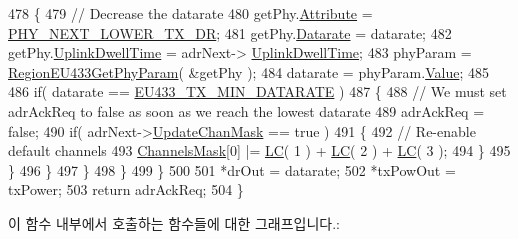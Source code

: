 \begin{DoxyCode}
478                 \{
479                     \textcolor{comment}{// Decrease the datarate}
480                     getPhy.\mbox{\hyperlink{structs_get_phy_params_abdcb168ffd6913b85e2f635d7a475f2d}{Attribute}} = \mbox{\hyperlink{group___r_e_g_i_o_n_gga51cbe8f5433d914fe9cf81b451de2c2dac002e7e492cf30dbf9c544b062f5cc8a}{PHY\_NEXT\_LOWER\_TX\_DR}};
481                     getPhy.\mbox{\hyperlink{structs_get_phy_params_ae2f6080f3aa0e9485c55513ca56bb24d}{Datarate}} = datarate;
482                     getPhy.\mbox{\hyperlink{structs_get_phy_params_a0e6663762d6f9173bc8d8cb018f8f17a}{UplinkDwellTime}} = adrNext->
      \mbox{\hyperlink{structs_adr_next_params_a0e6663762d6f9173bc8d8cb018f8f17a}{UplinkDwellTime}};
483                     phyParam = \mbox{\hyperlink{group___r_e_g_i_o_n_e_u433_ga407d34fe6c7dea18b07732d03b62894b}{RegionEU433GetPhyParam}}( &getPhy );
484                     datarate = phyParam.\mbox{\hyperlink{unionu_phy_param_a8e0dcce3428a8051614e852b8836d0d1}{Value}};
485 
486                     \textcolor{keywordflow}{if}( datarate == \mbox{\hyperlink{group___r_e_g_i_o_n_e_u433_ga800fe5b0107ad06f0938c226022b436b}{EU433\_TX\_MIN\_DATARATE}} )
487                     \{
488                         \textcolor{comment}{// We must set adrAckReq to false as soon as we reach the lowest datarate}
489                         adrAckReq = \textcolor{keyword}{false};
490                         \textcolor{keywordflow}{if}( adrNext->\mbox{\hyperlink{structs_adr_next_params_a708080da9c63d868556b2c48cb53003b}{UpdateChanMask}} == \textcolor{keyword}{true} )
491                         \{
492                             \textcolor{comment}{// Re-enable default channels}
493                             \mbox{\hyperlink{_region_e_u433_8c_a2188957b5ca6af8092154d7ccbfa5757}{ChannelsMask}}[0] |= \mbox{\hyperlink{group___r_e_g_i_o_n_ga12fa17e5c1016e01a9d82c25027deb1b}{LC}}( 1 ) + \mbox{\hyperlink{group___r_e_g_i_o_n_ga12fa17e5c1016e01a9d82c25027deb1b}{LC}}( 2 ) + 
      \mbox{\hyperlink{group___r_e_g_i_o_n_ga12fa17e5c1016e01a9d82c25027deb1b}{LC}}( 3 );
494                         \}
495                     \}
496                 \}
497             \}
498         \}
499     \}
500 
501     *drOut = datarate;
502     *txPowOut = txPower;
503     \textcolor{keywordflow}{return} adrAckReq;
504 \}
\end{DoxyCode}
이 함수 내부에서 호출하는 함수들에 대한 그래프입니다.\+:
\mbox{\label{group___r_e_g_i_o_n_e_u433_ga9c7cbfea2a1da97a1b4fa803eb3d92ce}} 
